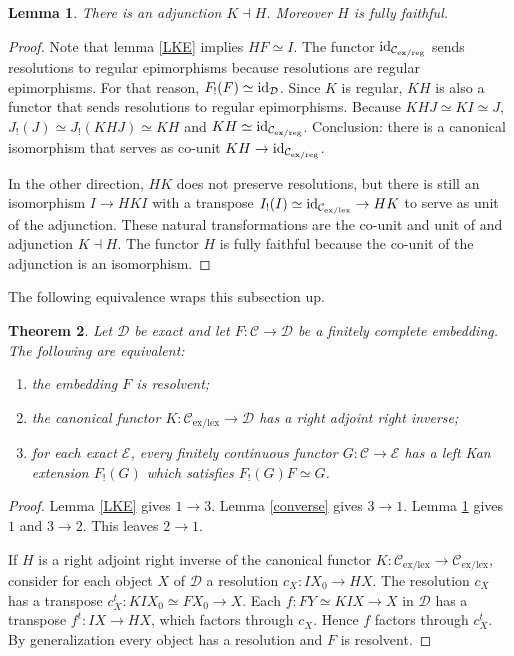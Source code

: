 \documentclass[sort&compress]{elsarticle}
\theoremstyle{plain}
\newtheorem{theorem}{Theorem}
\newtheorem{lemma}[theorem]{Lemma}
\theoremstyle{definition}
\theoremstyle{remark}
\newcommand\hide[1]{}
\newcommand\cat\mathcal
\newcommand\exlex{_\mathrm{ex/lex}}
\newcommand\exreg{_\mathrm{ex/reg}}
\begin{document}
\begin{lemma} There is an adjunction $K\dashv H$. Moreover $H$ is fully faithful. \label{adjunct} \end{lemma}

\begin{proof} \hide{Apply the adjoint functor theorem to $K$!  Can't! $K$ is not fully faithful! }
Note that lemma \ref{LKE} implies $HF\simeq I$. 
The functor $\id_{\cat C\exreg}$ sends resolutions to regular epimorphisms because resolutions are regular epimorphisms. For that reason, $F_!(F)\simeq \id_{\cat D}$. 
Since $K$ is regular, $KH$ is also a functor that sends resolutions to regular epimorphisms. Because $KHJ\simeq KI\simeq J$, $J_!(J) \simeq J_!(KHJ)\simeq KH$ and $KH\simeq \id_{\cat C\exreg}$. Conclusion: there is a canonical isomorphism that serves as co-unit $KH \to \id_{\cat C\exreg}$.

In the other direction, $HK$ does not preserve resolutions, but there is still an isomorphism $I \to HKI$ with a transpose $I_!(I)\simeq \id_{\cat C\exlex} \to HK$ to serve as unit of the adjunction.
These natural transformations are the co-unit and unit of and adjunction $K\dashv H$. The functor $H$ is fully faithful because the co-unit of the adjunction is an isomorphism.%
\end{proof}

The following equivalence wraps this subsection up.

\begin{theorem} Let $\cat D$ be exact and let $F:\cat C\to\cat D$ be a finitely complete embedding. The following are equivalent:
\begin{enumerate}
\item the embedding $F$ is resolvent;
\item the canonical functor $K:\cat C\exlex \to \cat D$ has a right adjoint right inverse;
\item for each exact $\cat E$, every finitely continuous functor $G:\cat C \to \cat E$ has a left Kan extension $F_!(G)$ which satisfies $F_!(G)F\simeq G$.
\end{enumerate}\label{ThA}
\end{theorem}

\begin{proof} Lemma \ref{LKE} gives $1\to 3$. Lemma \ref{converse} gives $3\to 1$. Lemma \ref{adjunct} gives $1$ and $3\to 2$. This leaves $2\to 1$.

If $H$ is a right adjoint right inverse of the canonical functor $K:\cat C\exlex \to \cat C\exlex$, consider for each object $X$ of $\cat D$ a resolution $c_X:IX_0 \to HX$. The resolution $c_X$ has a transpose $c_X^t:KIX_0 \simeq FX_0 \to X$. Each $f:FY\simeq KIX \to X$ in $\cat D$ has a transpose $f^t: IX \to HX$, which factors through $c_X$. Hence $f$ factors through $c_X^t$. By generalization every object has a resolution and $F$ is resolvent.
\end{proof}
\end{document}
